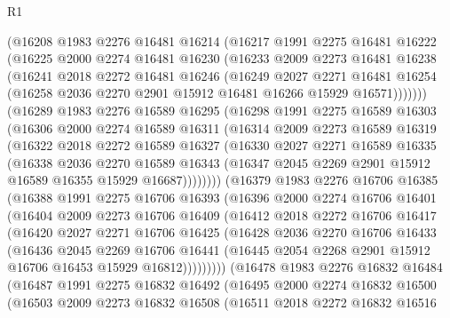 \begin{lexlean}{R1}
\begin{coremodule}
    (@16208
      @1983
      @2276
      @16481
      @16214
      (@16217
        @1991
        @2275
        @16481
        @16222
        (@16225
          @2000
          @2274
          @16481
          @16230
          (@16233
            @2009
            @2273
            @16481
            @16238
            (@16241
              @2018
              @2272
              @16481
              @16246
              (@16249
                @2027
                @2271
                @16481
                @16254
                (@16258 @2036 @2270 @2901 @15912 @16481 @16266 @15929 @16571)))))))
    (@16289
      @1983
      @2276
      @16589
      @16295
      (@16298
        @1991
        @2275
        @16589
        @16303
        (@16306
          @2000
          @2274
          @16589
          @16311
          (@16314
            @2009
            @2273
            @16589
            @16319
            (@16322
              @2018
              @2272
              @16589
              @16327
              (@16330
                @2027
                @2271
                @16589
                @16335
                (@16338
                  @2036
                  @2270
                  @16589
                  @16343
                  (@16347 @2045 @2269 @2901 @15912 @16589 @16355 @15929 @16687))))))))
    (@16379
      @1983
      @2276
      @16706
      @16385
      (@16388
        @1991
        @2275
        @16706
        @16393
        (@16396
          @2000
          @2274
          @16706
          @16401
          (@16404
            @2009
            @2273
            @16706
            @16409
            (@16412
              @2018
              @2272
              @16706
              @16417
              (@16420
                @2027
                @2271
                @16706
                @16425
                (@16428
                  @2036
                  @2270
                  @16706
                  @16433
                  (@16436
                    @2045
                    @2269
                    @16706
                    @16441
                    (@16445 @2054 @2268 @2901 @15912 @16706 @16453 @15929 @16812)))))))))
    (@16478
      @1983
      @2276
      @16832
      @16484
      (@16487
        @1991
        @2275
        @16832
        @16492
        (@16495
          @2000
          @2274
          @16832
          @16500
          (@16503
            @2009
            @2273
            @16832
            @16508
            (@16511
              @2018
              @2272
              @16832
              @16516

\end{coremodule}
\end{lexlean}
